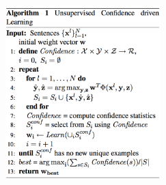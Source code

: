\documentclass{beamer}
\begin{document}
\begin{frame}
{\begin{columns}
            \includegraphics[width=6cm,height=7.5cm]{img/confidence-unsupervised-learning.png}

        \end{columns}
    }
\end{frame}
\end{document}
